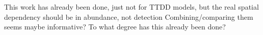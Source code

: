 \documentclass[useAMS,usenatbib,referee,12pt]{article}
\begin{document}
This work has already been done, just not for TTDD models, but the real spatial dependency should be in abundance, not detection
Combining/comparing them seems maybe informative?  To what degree has this already been done?
\end{document}

